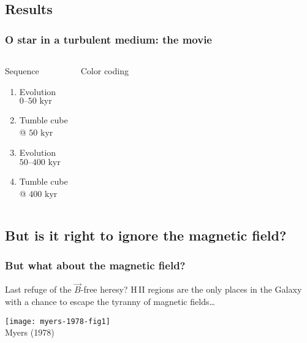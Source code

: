 \documentclass{beamer}
\newcommand\Ref[1]{\textcolor{white!70!black!90!yellow}{#1}}
\begin{document}
\newlength\maxheight
\setlength\maxheight{0.8\textheight}

\subsection{Results}
\begin{frame}[compact]
\frametitle{O star in a turbulent medium: the movie}
\begin{columns}
\begin{block}{Sequence}
  \begin{enumerate}
  \item Evolution\\ \(\textrm{0--50~kyr}\) 
  \item Tumble cube\\ @ \(\textrm{50~kyr}\)
  \item Evolution\\ \(\textrm{50--400~kyr}\)
  \item Tumble cube\\ @ \(\textrm{400~kyr}\)
  \end{enumerate}
\end{block}
\begin{block}{Color coding}
  \color{red}{[N\,II]}\quad
  \color{green}{H\large\bfseries\begin{greek}a\end{greek}}\quad
  \color{blue}{[O\,III]}
\end{block}
\end{columns}
\end{frame}


\subsection{But is it right to ignore the magnetic field?}


\begin{frame}
  \frametitle{But what about the magnetic field?}
  \begin{alertblock}{Last refuge of the \(\vec{B}\)-free heresy?}
    H\,II regions are the only places in the Galaxy with a chance to
    escape the tyranny
    of magnetic fields\dots\par\centering
    \texttt{[image: myers-1978-fig1]}\\
    \Ref{Myers (1978)}
  \end{alertblock}
\end{frame}
\end{document}
